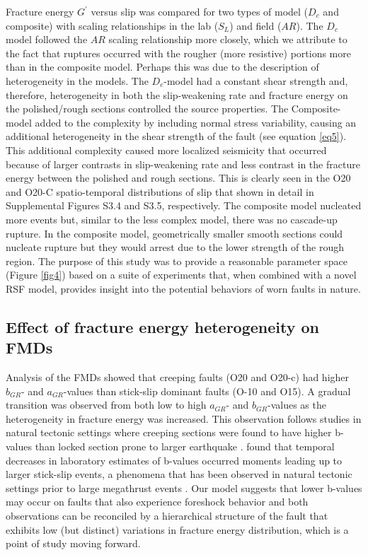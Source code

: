 \documentclass[preprint,1p, 10pt,authoryear]{elsarticle}
\begin{document}
Fracture energy $G^{'}$ versus slip was compared for two types of model ($D_{c}$ and composite) with scaling relationships in the lab ($S_{L}$) and field ($AR$). The $D_{c}$ model followed the $AR$ scaling relationship more closely, which we attribute to the fact that ruptures occurred with the rougher (more resistive) portions more than in the composite model.  Perhaps this was due to the description of heterogeneity in the models. The $D_{c}$-model had a constant shear strength and, therefore, heterogeneity in both the slip-weakening rate and fracture energy on the polished/rough sections controlled the source properties. The Composite-model added to the complexity by including normal stress variability, causing an additional heterogeneity in the shear strength of the fault (see equation \eqref{eq5}). This additional complexity caused more localized seismicity that occurred because of larger contrasts in slip-weakening rate and less contrast in the fracture energy between the polished and rough sections. This is clearly seen in the O20 and O20-C spatio-temporal distributions of slip that shown in detail in Supplemental Figures S3.4 and S3.5, respectively. The composite model nucleated more events but, similar to the less complex model, there was no cascade-up rupture.  In the composite model, geometrically smaller smooth sections could nucleate rupture but they would arrest due to the lower strength of the rough region. The purpose of this study was to provide a reasonable parameter space (Figure \ref{fig4}) based on a suite of experiments that, when combined with a novel RSF model, provides insight into the potential behaviors of worn faults in nature.

\subsection{Effect of fracture energy heterogeneity on FMDs}
\label{EffectsFMD}
Analysis of the FMDs showed that creeping faults (O20 and O20-c) had higher $b_{GR}$- and $a_{GR}$-values than stick-slip dominant faults (O-10 and O15). A gradual transition was observed from both low to high $a_{GR}$- and $b_{GR}$-values as the heterogeneity in fracture energy was increased. This observation follows studies in natural tectonic settings where creeping sections were found to have higher b-values than locked section prone to larger earthquake \citep{Amelung1997, Tormann2014}. \citet{Goebel2013} found that temporal decreases in laboratory estimates of b-values occurred moments leading up to larger stick-slip events, a phenomena that has been observed in natural tectonic settings prior to large megathrust events \citep{Tormann2015,Gulia2016,Gulia2019}. Our model suggests that lower b-values may occur on faults that also experience foreshock behavior and both observations can be reconciled by a hierarchical structure of the fault that exhibits low (but distinct) variations in fracture energy distribution, which is a point of study moving forward.
\end{document}
